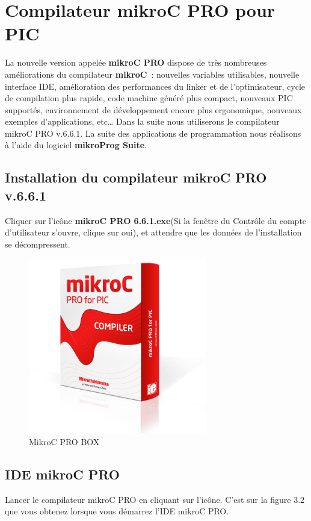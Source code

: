 \documentclass[a4paper, 12pt]{book}
\newcounter{program}[subsection]
\begin{document}
\section{Compilateur mikroC PRO pour PIC}
La nouvelle version appelée \textbf{mikroC PRO} dispose de très nombreuses améliorations du compilateur \textbf{mikroC}~: nouvelles variables utilisables, nouvelle interface IDE, amélioration des performances du linker et de l’optimisateur, cycle de compilation plus rapide, code machine généré plus compact, nouveaux PIC supportés, environnement de développement encore plus ergonomique, nouveaux exemples d’applications, etc…
Dans la suite nous utiliserons le compilateur mikroC PRO v.6.6.1.
La suite des applications de programmation nous réalisons à l’aide du logiciel \textbf{mikroProg Suite}.\\

\subsection{Installation du compilateur mikroC PRO v.6.6.1}
Cliquer sur l'icône \textbf{mikroC PRO 6.6.1.exe}(Si la fenêtre du Contrôle du compte d’utilisateur s’ouvre, clique sur oui), et attendre que les données de l’installation se décompressent.\\
\begin{figure}[htbp]
  \centering
  \includegraphics[width=0.5\linewidth]{images/mikroc_pro_pic_box.png}
  \caption{MikroC PRO BOX}
\end{figure}

\subsection{IDE mikroC PRO}
Lancer le compilateur mikroC PRO en cliquant sur l’icône. C’est sur la figure 3.2 que vous obtenez lorsque vous démarrez l’IDE mikroC PRO.\\
\end{document}

